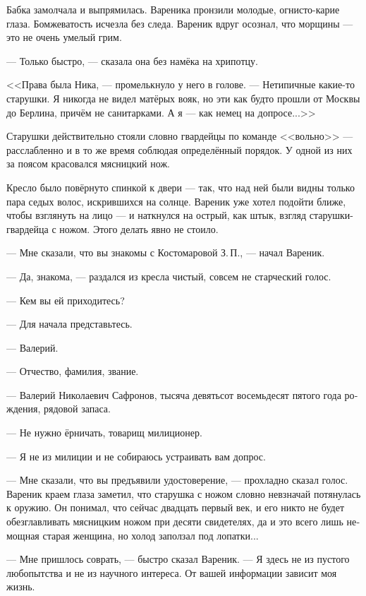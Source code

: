 \documentclass[a5paper,12pt,fleqn]{extbook}\usepackage{cooltooltips}\usepackage{polyglossia}\setdefaultlanguage[babelshorthands=true]{russian}\setotherlanguage{english}\defaultfontfeatures{Ligatures=TeX,Mapping=tex-text} \usepackage{xcolor}\definecolor{lightgray}{HTML}{bbbbbb}\color{lightgray}\newcommand{\ml}[3]{\textenglish{\textcolor{black}{#3}}}
\newcommand{\asterism}{\vspace{1em}{\centering\Large\bfseries$\ast~\ast~\ast$\par}\vspace{1em}}
\newcommand{\textspace}{\vspace{1em}{\centering\Large\bfseries<...>\par}\vspace{1em}}
\begin{document}
Бабка замолчала и выпрямилась.
Вареника пронзили молодые, огнисто-карие глаза.
Бомжеватость исчезла без следа.
Вареник вдруг осознал, что морщины --- это не очень умелый грим.

--- Только быстро, --- сказала она без намёка на хрипотцу.

\asterism

\textspace

<<Права была Ника, --- промелькнуло у него в голове.
--- Нетипичные какие-то старушки.
Я никогда не видел матёрых вояк, но эти как будто прошли от Москвы до Берлина, причём не санитарками.
А я --- как немец на допросе...>>

Старушки действительно стояли словно гвардейцы по команде <<вольно>> --- расслабленно и в то же время соблюдая определённый порядок.
У одной из них за поясом красовался мясницкий нож.

Кресло было повёрнуто спинкой к двери --- так, что над ней были видны только пара седых волос, искрившихся на солнце.
Вареник уже хотел подойти ближе, чтобы взглянуть на лицо --- и наткнулся на острый, как штык, взгляд старушки-гвардейца с ножом.
Этого делать явно не стоило.

--- Мне сказали, что вы знакомы с Костомаровой З.\,П., --- начал Вареник.

--- Да, знакома, --- раздался из кресла чистый, совсем не старческий голос.

--- Кем вы ей приходитесь?

--- Для начала представьтесь.

--- Валерий.

--- Отчество, фамилия, звание.

--- Валерий Николаевич Сафронов, тысяча девятьсот восемьдесят пятого года рождения, рядовой запаса.

--- Не нужно ёрничать, товарищ милиционер.

--- Я не из милиции и не собираюсь устраивать вам допрос.

--- Мне сказали, что вы предъявили удостоверение, --- прохладно сказал голос.
Вареник краем глаза заметил, что старушка с ножом словно невзначай потянулась к оружию.
Он понимал, что сейчас двадцать первый век, и его никто не будет обезглавливать мясницким ножом при десяти свидетелях, да и это всего лишь немощная старая женщина, но холод заползал под лопатки...

--- Мне пришлось соврать, --- быстро сказал Вареник.
--- Я здесь не из пустого любопытства и не из научного интереса.
От вашей информации зависит моя жизнь.
\end{document}

